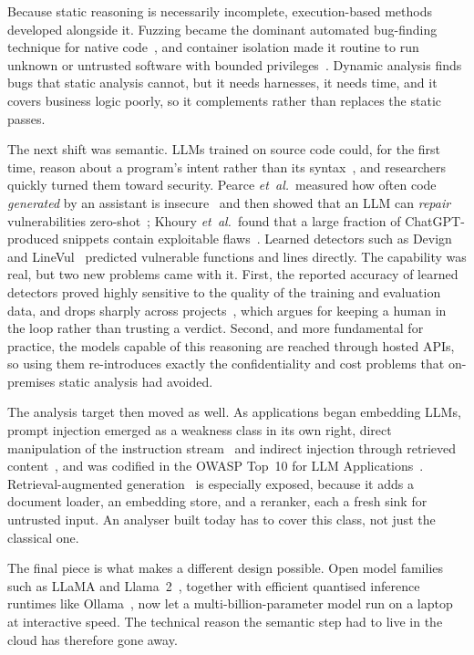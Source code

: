 Because static reasoning is necessarily incomplete, execution-based
methods developed alongside it. Fuzzing became the dominant automated
bug-finding technique for native code~\cite{manes2021}, and container
isolation made it routine to run unknown or untrusted software with
bounded privileges~\cite{merkel2014docker}. Dynamic analysis finds bugs
that static analysis cannot, but it needs harnesses, it needs time, and
it covers business logic poorly, so it complements rather than replaces
the static passes.

The next shift was semantic. LLMs trained on source code could, for the
first time, reason about a program's intent rather than its
syntax~\cite{chen2021codex}, and researchers quickly turned them toward
security. Pearce \textit{et~al.}\ measured how often code \emph{generated}
by an assistant is insecure~\cite{pearce2022} and then showed that an LLM
can \emph{repair} vulnerabilities zero-shot~\cite{pearce2023}; Khoury
\textit{et~al.}\ found that a large fraction of ChatGPT-produced snippets
contain exploitable flaws~\cite{khoury2023}. Learned detectors such as
Devign~\cite{zhou2019devign} and LineVul~\cite{fu2022linevul} predicted
vulnerable functions and lines directly. The capability was real, but two
new problems came with it. First, the reported accuracy of learned
detectors proved highly sensitive to the quality of the training and
evaluation data, and drops sharply across
projects~\cite{steenhoek2023,croft2023}, which argues for keeping a human
in the loop rather than trusting a verdict. Second, and more
fundamental for practice, the models capable of this reasoning are
reached through hosted APIs, so using them re-introduces exactly the
confidentiality and cost problems that on-premises static analysis had
avoided.

The analysis target then moved as well. As applications began embedding
LLMs, prompt injection emerged as a weakness class in its own
right, direct manipulation of the instruction stream~\cite{perez2022ignore}
and indirect injection through retrieved content~\cite{greshake2023}, and
was codified in the OWASP Top~10 for LLM
Applications~\cite{owaspllm2025}. Retrieval-augmented
generation~\cite{lewis2020rag} is especially exposed, because it adds a
document loader, an embedding store, and a reranker, each a fresh sink for
untrusted input. An analyser built today has to cover this class, not
just the classical one.

The final piece is what makes a different design possible. Open model
families such as LLaMA and Llama~2~\cite{touvron2023llama,touvron2023llama2},
together with efficient quantised inference runtimes like
Ollama~\cite{ollama}, now let a multi-billion-parameter model run on a
laptop at interactive speed. The technical reason the semantic step had
to live in the cloud has therefore gone away.

